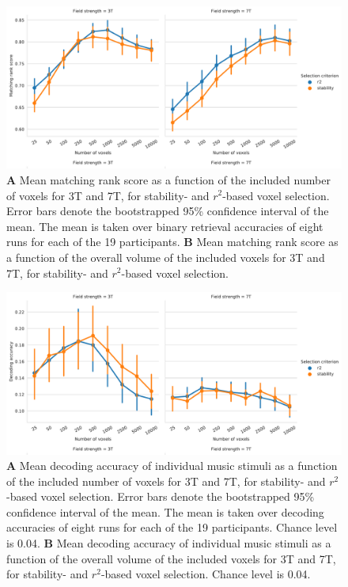 \begin{figure}[H]
  \centering
    \includegraphics[width=\linewidth]{pics/rank_selection.pdf}
	
  \caption{\textbf{A} Mean matching rank score as a function of the included number
  of voxels for 3T and 7T, for stability- and $r^2$-based voxel selection.
  Error bars denote the bootstrapped 95\% confidence interval of the mean. The
  mean is taken over binary retrieval accuracies of eight runs for each of the
  19 participants. \textbf{B} Mean matching rank score as a function of the overall
volume of the included voxels for 3T and 7T, for stability- and
$r^2$-based voxel selection.}

 \label{fig:matching_score_selection}
\end{figure}


\begin{figure}[H]
  \centering
    \includegraphics[width=\linewidth]{pics/decoding_selection.pdf}

	\caption{\textbf{A} Mean decoding accuracy of individual music stimuli as a function of
  the included number of voxels for 3T and 7T, for stability- and
  $r^2$-based voxel selection. Error bars denote the bootstrapped 95\%
  confidence interval of the mean. The mean is taken over decoding
  accuracies of eight runs for each of the 19 participants. Chance level is
    0.04. \textbf{B} Mean
decoding accuracy of individual music stimuli as a function of the overall volume of the
included voxels for 3T and 7T, for stability- and $r^2$-based voxel
selection. Chance level is 0.04.
}
 \label{fig:decoding_accuracy_stimulus_selection}
\end{figure}

